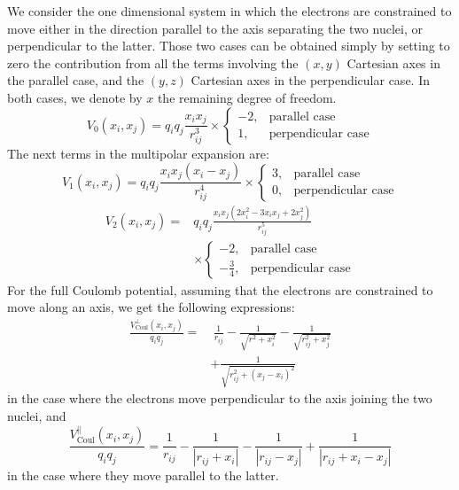 \documentclass[reprint, amsmath, amssymb, aps]{revtex4-2}
\begin{document}
        We consider the one dimensional system in which the electrons are constrained to move either in the direction parallel to the axis separating the two nuclei, or perpendicular to the latter.
        Those two cases can be obtained simply by setting to zero the contribution from all the terms involving the $(x,y)$ Cartesian axes in the parallel case, and the $(y,z)$ Cartesian axes in the perpendicular case. In both cases, we denote by $x$ the remaining degree of freedom.
        \begin{equation}
            V_0(x_i, x_j) = q_iq_j\frac{x_ix_j}{r_{ij}^3}\times
            \begin{cases}
                -2, & \text{parallel case} \\
                1, & \text{perpendicular case}
            \end{cases}
        \end{equation}
        The next terms in the multipolar expansion are:
        \begin{equation}
            V_1(x_i, x_j) = q_iq_j\frac{x_ix_j(x_i-x_j)}{r_{ij}^4}\times
            \begin{cases}
                3, & \text{parallel case} \\
                0, & \text{perpendicular case}
            \end{cases}
        \end{equation}
        \begin{equation}
            \begin{split}
                V_2(x_i, x_j) = &q_iq_j\frac{x_ix_j(2x_i^2-3x_ix_j+2x_j^2)}{r_{ij}^5}\\
                &\times
                \begin{cases}
                    -2, & \text{parallel case} \\
                -\frac{3}{4}, & \text{perpendicular case}
                \end{cases}
            \end{split}
        \end{equation}
        For the full Coulomb potential, assuming that the electrons are constrained to move along an axis, we get the following expressions:
        \begin{equation}
        \begin{split}
            \frac{V_\text{Coul}^\perp(x_i, x_j)}{q_iq_j} = &\ \frac{1}{r_{ij}} - \frac{1}{\sqrt{r^2+x_i^2}} - \frac{1}{\sqrt{r_{ij}^2+x_j^2}} \\
            &+\frac{1}{\sqrt{r_{ij}^2 + (x_j-x_i)^2}}
        \end{split}
        \end{equation}
        in the case where the electrons move perpendicular to the axis joining the two nuclei, and
        \begin{equation}
            \frac{V_\text{Coul}^{||}(x_i, x_j)}{q_iq_j} = \frac{1}{r_{ij}} - \frac{1}{|r_{ij}+x_i|} - \frac{1}{|r_{ij}-x_j|} + \frac{1}{|r_{ij}+x_i-x_j|}
        \end{equation}
        in the case where they move parallel to the latter.
\end{document}
